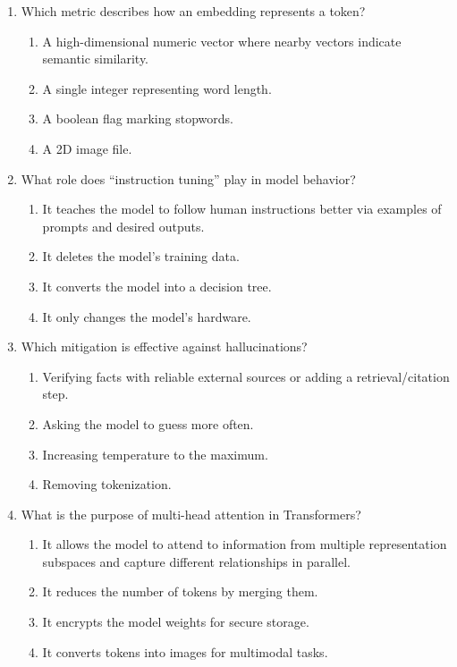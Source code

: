 \documentclass[11pt,a4paper]{article}
\begin{document}
\begin{enumerate}[leftmargin=*, label=\textbf{\#\arabic*}]
  \item Which metric describes how an embedding represents a token?\\
    \begin{enumerate}[label=\Alph*)]
      \item A high-dimensional numeric vector where nearby vectors indicate semantic similarity.
      \item A single integer representing word length.
      \item A boolean flag marking stopwords.
      \item A 2D image file.
    \end{enumerate}

  \item What role does ``instruction tuning'' play in model behavior?\\
    \begin{enumerate}[label=\Alph*)]
      \item It teaches the model to follow human instructions better via examples of prompts and desired outputs.
      \item It deletes the model's training data.
      \item It converts the model into a decision tree.
      \item It only changes the model's hardware.
    \end{enumerate}

  \item Which mitigation is effective against hallucinations?\\
    \begin{enumerate}[label=\Alph*)]
      \item Verifying facts with reliable external sources or adding a retrieval/citation step.
      \item Asking the model to guess more often.
      \item Increasing temperature to the maximum.
      \item Removing tokenization.
    \end{enumerate}

  \item What is the purpose of multi-head attention in Transformers?\\
    \begin{enumerate}[label=\Alph*)]
      \item It allows the model to attend to information from multiple representation subspaces and capture different relationships in parallel.
      \item It reduces the number of tokens by merging them.
      \item It encrypts the model weights for secure storage.
      \item It converts tokens into images for multimodal tasks.
    \end{enumerate}


\end{enumerate}
\end{document}
